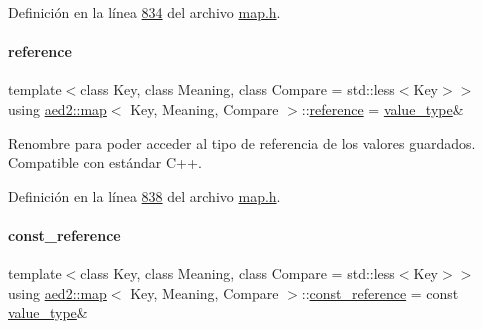 Definición en la línea \hyperlink{map_8h_source_l00834}{834} del archivo \hyperlink{map_8h_source}{map.\+h}.

\mbox{\label{classaed2_1_1map_af4f147533b3c0207ab036c86ce13ec0d_af4f147533b3c0207ab036c86ce13ec0d}} 
\paragraph{\texorpdfstring{reference}{reference}}
{\footnotesize\ttfamily template$<$class Key, class Meaning, class Compare = std\+::less$<$\+Key$>$$>$ \\
using \hyperlink{classaed2_1_1map}{aed2\+::map}$<$ Key, Meaning, Compare $>$\+::\hyperlink{classaed2_1_1map_af4f147533b3c0207ab036c86ce13ec0d_af4f147533b3c0207ab036c86ce13ec0d}{reference} =  \hyperlink{classaed2_1_1map_a719db98e0ff9a837610f76be33264680_a719db98e0ff9a837610f76be33264680}{value\+\_\+type}\&}



Renombre para poder acceder al tipo de referencia de los valores guardados. Compatible con estándar C++. 



Definición en la línea \hyperlink{map_8h_source_l00838}{838} del archivo \hyperlink{map_8h_source}{map.\+h}.

\mbox{\label{classaed2_1_1map_a277080d3db76f19df9319ecba16475a9_a277080d3db76f19df9319ecba16475a9}} 
\paragraph{\texorpdfstring{const\+\_\+reference}{const\_reference}}
{\footnotesize\ttfamily template$<$class Key, class Meaning, class Compare = std\+::less$<$\+Key$>$$>$ \\
using \hyperlink{classaed2_1_1map}{aed2\+::map}$<$ Key, Meaning, Compare $>$\+::\hyperlink{classaed2_1_1map_a277080d3db76f19df9319ecba16475a9_a277080d3db76f19df9319ecba16475a9}{const\+\_\+reference} =  const \hyperlink{classaed2_1_1map_a719db98e0ff9a837610f76be33264680_a719db98e0ff9a837610f76be33264680}{value\+\_\+type}\&}



